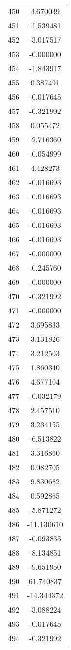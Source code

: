 \documentclass[12pt]{article}
\begin{document}
\begin{longtable}{@{}cc@{}}
450 & 4.670039 \\
451 & -1.539481 \\
452 & -3.017517 \\
453 & -0.000000 \\
454 & -1.843917 \\
455 & 0.387491 \\
456 & -0.017645 \\
457 & -0.321992 \\
458 & 0.055472 \\
459 & -2.716360 \\
460 & -0.054999 \\
461 & 4.428273 \\
462 & -0.016693 \\
463 & -0.016693 \\
464 & -0.016693 \\
465 & -0.016693 \\
466 & -0.016693 \\
467 & -0.000000 \\
468 & -0.245760 \\
469 & -0.000000 \\
470 & -0.321992 \\
471 & -0.000000 \\
472 & 3.695833 \\
473 & 3.131826 \\
474 & 3.212503 \\
475 & 1.860340 \\
476 & 4.677104 \\
477 & -0.032179 \\
478 & 2.457510 \\
479 & 3.234155 \\
480 & -6.513822 \\
481 & 3.316860 \\
482 & 0.082705 \\
483 & 9.830682 \\
484 & 0.592865 \\
485 & -5.871272 \\
486 & -11.130610 \\
487 & -6.093833 \\
488 & -8.134851 \\
489 & -9.651950 \\
490 & 61.740837 \\
491 & -14.344372 \\
492 & -3.088224 \\
493 & -0.017645 \\
494 & -0.321992 \\

\end{longtable}
\end{document}
